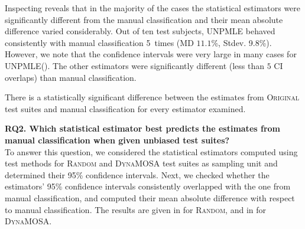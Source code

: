 \documentclass[sigconf,review,anonymous]{acmart}
\newcommand{\Unpmle}{UNPMLE\xspace}
\newcommand{\original}{\textsc{Original}\xspace}
\newcommand{\EvosuiteRandom}{\textsc{Random}\xspace}
\newcommand{\EvosuiteDynamosa}{\textsc{DynaMOSA}\xspace}
\begin{document}
Inspecting  reveals that in the majority of the cases the
statistical estimators were significantly different from the manual classification
and their mean absolute difference varied considerably.
Out of ten test subjects, \Unpmle behaved consistently with manual classification
5~times (MD $11.1$\%, Stdev. 9.8\%). However, we note that the confidence
intervals were very large in many cases for \Unpmle ().
%
%
The other estimators were significantly different %
(less than $5$ CI overlaps)
 than manual classification.

\begin{tcolorbox}[boxrule=0.5pt, arc=4pt, boxsep=0pt, width=\columnwidth]
There is a statistically significant difference between the estimates
from \original test suites and manual classification for
every estimator examined.
\end{tcolorbox}

\noindent\textbf{RQ2. Which statistical estimator best predicts the estimates
from manual classification when given unbiased test suites?}\\
%
To answer this question, we considered the statistical estimators computed
using test methods for \EvosuiteRandom and \EvosuiteDynamosa test suites as sampling unit
and determined their 95\% confidence intervals.
%
Next, we checked whether the estimators' 95\% confidence intervals consistently
overlapped with the one from manual classification, and computed their mean absolute
difference with respect to manual classification.
%
The results are given in  for \EvosuiteRandom, and in
 for \EvosuiteDynamosa.
\end{document}
